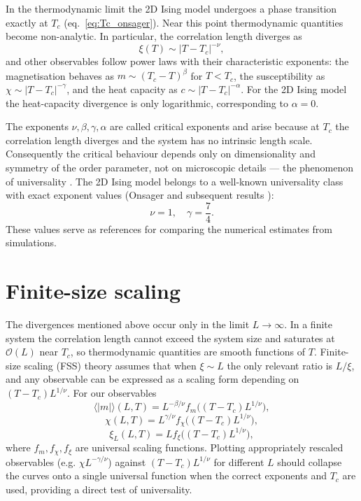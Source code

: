 In the thermodynamic limit the 2D Ising model undergoes a phase transition exactly at $T_c$ (eq.~\ref{eq:Tc_onsager}). Near this point thermodynamic quantities become non-analytic. In particular, the correlation length diverges as
\[ \xi(T)\sim|T-T_c|^{-\nu}, \]
and other observables follow power laws with their characteristic exponents: the magnetisation behaves as $m\sim(T_c-T)^{\beta}$ for $T<T_c$, the susceptibility as $\chi\sim|T-T_c|^{-\gamma}$, and the heat capacity as $c\sim|T-T_c|^{-\alpha}$. For the 2D Ising model the heat-capacity divergence is only logarithmic, corresponding to $\alpha=0$.

The exponents $\nu,\beta,\gamma,\alpha$ are called critical exponents and arise because at $T_c$ the correlation length diverges and the system has no intrinsic length scale. Consequently the critical behaviour depends only on dimensionality and symmetry of the order parameter, not on microscopic details — the phenomenon of universality \citep{Wilson1974}. The 2D Ising model belongs to a well-known universality class with exact exponent values (Onsager and subsequent results \citep{Yang1952}):
\[ \nu=1,\quad \gamma=\frac{7}{4}. \]
These values serve as references for comparing the numerical estimates from simulations.

\section{Finite-size scaling} \label{sec:fss}

The divergences mentioned above occur only in the limit $L\to\infty$. In a finite system the correlation length cannot exceed the system size and saturates at $\mathcal{O}(L)$ near $T_c$, so thermodynamic quantities are smooth functions of $T$. Finite-size scaling (FSS) theory \citep{Fisher1972} assumes that when $\xi\sim L$ the only relevant ratio is $L/\xi$, and any observable can be expressed as a scaling form depending on $(T-T_c)L^{1/\nu}$. For our observables
\[ \langle|m|\rangle(L,T)=L^{-\beta/\nu} f_m\big((T-T_c)L^{1/\nu}\big), \]
\begin{equation} \label{eq:fss_chi2}
    \chi(L,T)=L^{\gamma/\nu} f_\chi\big((T-T_c)L^{1/\nu}\big),
\end{equation}
\begin{equation} \label{eq:fss_xi2}
    \xi_L(L,T)=L f_\xi\big((T-T_c)L^{1/\nu}\big),
\end{equation}
where $f_m,f_\chi,f_\xi$ are universal scaling functions. Plotting appropriately rescaled observables (e.g. $\chi L^{-\gamma/\nu}$) against $(T-T_c)L^{1/\nu}$ for different $L$ should collapse the curves onto a single universal function when the correct exponents and $T_c$ are used, providing a direct test of universality.

